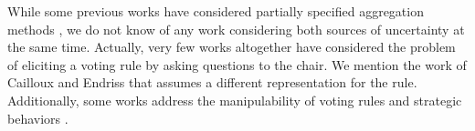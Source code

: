 \documentclass[runningheads]{llncs}
\begin{document}
While some previous works have considered partially specified aggregation methods \cite{Stein1994,Llamazares2013,Viappiani2018}, we do not know of any work considering both sources of uncertainty at the same time. 
Actually, very few works altogether have considered the problem of eliciting a voting rule by asking questions to the chair. We mention the work of Cailloux and Endriss \cite{Cailloux2014} that assumes a different representation for the rule. %
Additionally, some works address the manipulability of voting rules \cite{Elkind2012,Dey2018,Dey2018_2,Conitzer2011,Baumeister2019} and 
strategic behaviors \cite{Endriss2016,Lev2019,Annemieke2012}.
\end{document}
